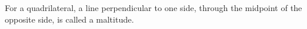  For a quadrilateral, a line perpendicular to one side, through
the midpoint of the opposite side, is called a maltitude.
